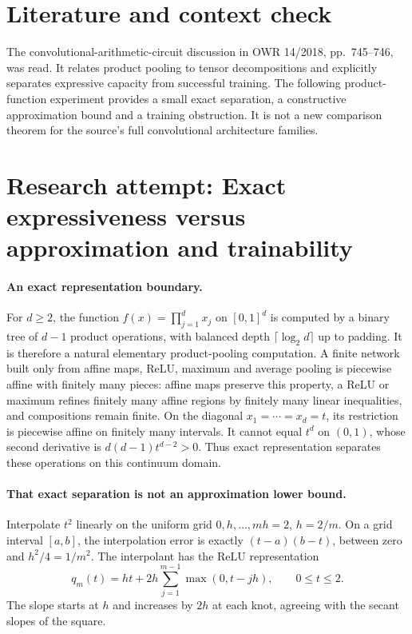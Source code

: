 \documentclass[11pt]{article}
\begin{document}
\section{Literature and context check}
The convolutional-arithmetic-circuit discussion in OWR 14/2018, pp.~745--746, was read. It relates product pooling to tensor decompositions and explicitly separates expressive capacity from successful training. The following product-function experiment provides a small exact separation, a constructive approximation bound and a training obstruction. It is not a new comparison theorem for the source's full convolutional architecture families.
\section{Research attempt: Exact expressiveness versus approximation and trainability}

\paragraph{An exact representation boundary.}
For $d\ge2$, the function $f(x)=\prod_{j=1}^d x_j$ on $[0,1]^d$ is computed by a binary tree of $d-1$ product operations, with balanced depth $\lceil\log_2d\rceil$ up to padding. It is therefore a natural elementary product-pooling computation. A finite network built only from affine maps, ReLU, maximum and average pooling is piecewise affine with finitely many pieces: affine maps preserve this property, a ReLU or maximum refines finitely many affine regions by finitely many linear inequalities, and compositions remain finite. On the diagonal $x_1=\cdots=x_d=t$, its restriction is piecewise affine on finitely many intervals. It cannot equal $t^d$ on $(0,1)$, whose second derivative is $d(d-1)t^{d-2}>0$. Thus exact representation separates these operations on this continuum domain.

\paragraph{That exact separation is not an approximation lower bound.}
Interpolate $t^2$ linearly on the uniform grid $0,h,\ldots,mh=2$, $h=2/m$. On a grid interval $[a,b]$, the interpolation error is exactly $(t-a)(b-t)$, between zero and $h^2/4=1/m^2$. The interpolant has the ReLU representation
\[
 q_m(t)=h t+2h\sum_{j=1}^{m-1}\max(0,t-jh),\qquad 0\le t\le2.
\]
The slope starts at $h$ and increases by $2h$ at each knot, agreeing with the secant slopes of the square.
\end{document}

